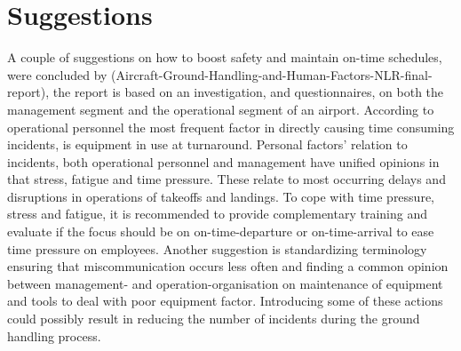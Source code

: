 \section{Suggestions}
    A couple of suggestions on how to boost safety and maintain on-time schedules, were concluded by (Aircraft-Ground-Handling-and-Human-Factors-NLR-final-report), the report is based on an investigation, and questionnaires, on both the management segment and the operational segment of an airport. According to operational personnel the most frequent factor in directly causing time consuming incidents, is equipment in use at turnaround. Personal factors' relation to incidents, both operational personnel and management have unified opinions in that stress, fatigue and time pressure. These relate to most occurring delays and disruptions in operations of takeoffs and landings. To cope with time pressure, stress and fatigue, it is recommended to provide complementary training and evaluate if the focus should be on on-time-departure or on-time-arrival to ease time pressure on employees. Another suggestion is standardizing terminology ensuring that miscommunication occurs less often and finding a common opinion between management- and operation-organisation on maintenance of equipment and tools to deal with poor equipment factor. Introducing some of these actions could possibly result in reducing the number of incidents during the ground handling process.

